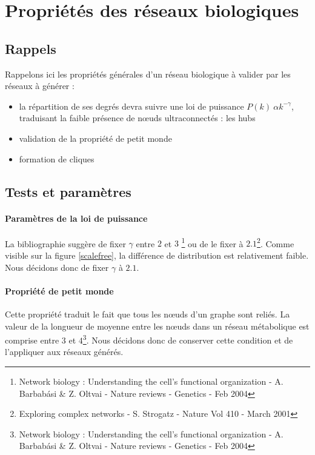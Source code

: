 \section{Propriétés des réseaux biologiques}


\subsection{Rappels}
Rappelons ici les propriétés générales d'un réseau biologique à valider par les réseaux à générer :
\begin{itemize}
	\item la répartition de ses degrés devra suivre une loi de puissance $ P(k) ~ \alpha k^{-\gamma} $, traduisant la faible présence de nœuds ultraconnectés : les hubs
	\item validation de la propriété de \og petit monde\fg
	\item formation de cliques 
\end{itemize}

\subsection{Tests et paramètres}
\paragraph*{Paramètres de la loi de puissance\\}
La bibliographie suggère de fixer $\gamma $ entre $2$ et $3$ \footnote{Network biology : Understanding the cell's functional organization - A. Barbab\'{a}si \& Z. Oltvai - Nature reviews - Genetics - Feb 2004} ou de le fixer à $2.1$\footnote{Exploring complex networks - S. Strogatz - Nature Vol 410 - March 2001}. Comme visible sur la figure \ref{scalefree}, la différence de distribution est relativement faible. Nous décidons donc de fixer $\gamma$ à $2.1$.


\paragraph*{Propriété de petit monde \\}
Cette propriété traduit le fait que tous les nœuds d'un graphe sont reliés. La valeur de la longueur de moyenne entre les nœuds dans un réseau métabolique est comprise entre $3$ et $4$\footnote{Network biology : Understanding the cell's functional organization - A. Barbab\'{a}si \& Z. Oltvai - Nature reviews - Genetics - Feb 2004}. Nous décidons donc de conserver cette condition et de l'appliquer aux réseaux générés.

